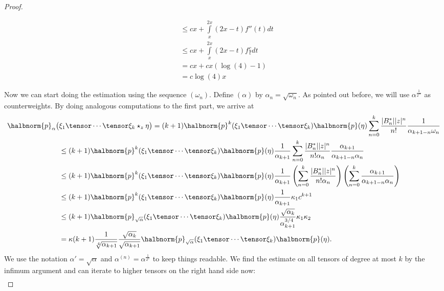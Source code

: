 \documentclass[
11pt,                          %
english                        %
]{article}
\begin{document}
\begin{proof}
\begin{subproof}
\begin{align*}
			& \leq
			cx + \int\limits_x^{2x} (2x-t) f''(t) dt
			\\
			& \leq
			cx + 
			\int\limits_x^{2x} (2x-t) f\frac{c}{t} dt
			\\
			&=
			cx + cx (\log(4) - 1)
			\\
			&=
			c \log(4) x
		\end{align*}
	\end{subproof}
	Now we can start doing the estimation using the sequence $(\omega_n)$. 
	Define $(\alpha)$ by $\alpha_n = \sqrt{\omega_n}$. As pointed out 
	before, we will use $\alpha^{\frac{1}{2^m}}$ as counterweights.
	By doing analogous computations to the first part, we arrive at
	\begin{align*}
		\halbnorm{p}_\alpha \big(
		&
			\xi_1 \tensor \cdots \tensor \xi_k
			\star_z
			\eta
		\big)
		=
		(k+1) 
		\halbnorm{p}^k(\xi_1 \tensor \cdots \tensor \xi_k)
		\halbnorm{p}(\eta)
		\sum\limits_{n=0}^k
		\frac{|B_n^*| |z|^n}{n!}
		\frac{1}{\alpha_{k+1-n} \omega_n}
		\\
		& \leq
		(k+1) 
		\halbnorm{p}^k(\xi_1 \tensor \cdots \tensor \xi_k)
		\halbnorm{p}(\eta)
		\frac{1}{\alpha_{k+1}}
		\sum\limits_{n=0}^k
		\frac{|B_n^*| |z|^n}{n! \alpha_n}
		\frac{\alpha_{k+1}}{\alpha_{k+1-n} \alpha_n}
		\\
		& \leq
		(k+1) 
		\halbnorm{p}^k(\xi_1 \tensor \cdots \tensor \xi_k)
		\halbnorm{p}(\eta)
		\frac{1}{\alpha_{k+1}}
		\left(
			\sum\limits_{n=0}^k
			\frac{|B_n^*| |z|^n}{n! \alpha_n}
		\right)
		\left(
			\sum\limits_{n=0}^k
			\frac{\alpha_{k+1}}{\alpha_{k+1-n} \alpha_n}
		\right)
		\\
		& \leq
		(k+1) 
		\halbnorm{p}^k(\xi_1 \tensor \cdots \tensor \xi_k)
		\halbnorm{p}(\eta)
		\frac{1}{\alpha_{k+1}}
		\kappa_1
		c^{k+1}
		\\
		& \leq
		(k+1) 
		\halbnorm{p}_{\sqrt{\alpha}}(\xi_1 \tensor \cdots \tensor \xi_k)
		\halbnorm{p}(\eta)
		\frac{\sqrt{\alpha_k}}{\alpha_{k+1}^{3/4}}
		\kappa_1
		\kappa_2
		\\
		&=
		\kappa
		(k+1)
		\frac{1}{\sqrt[4]{\alpha_{k+1}}}
		\frac{\sqrt{\alpha_k}}{\sqrt{\alpha_{k+1}}}
		\halbnorm{p}_{\sqrt{\alpha}}(\xi_1 \tensor \cdots \tensor \xi_k)
		\halbnorm{p}(\eta).
	\end{align*}
	We use the notation $\alpha' = \sqrt{\alpha}$ and $\alpha^{(n)} = 
	\alpha^{\frac{1}{2^n}}$ to keep things readable. We find the estimate on all 
	tensors of degree at most $k$ by the infimum argument and can iterate to higher 
	tensors on the right hand side now:
	\begin{align*}

\end{align*}
\end{proof}
\end{document}
